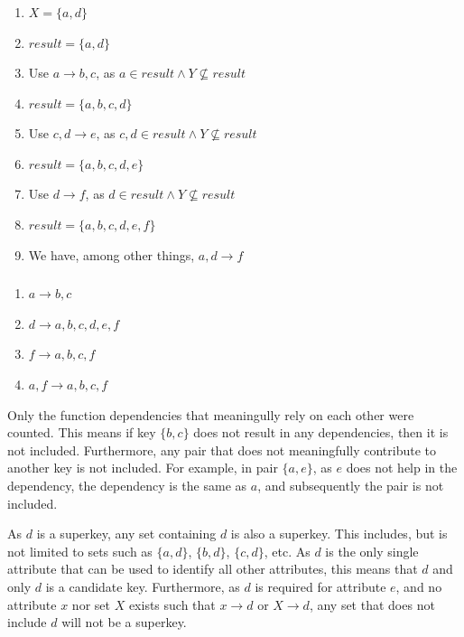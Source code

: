 \documentclass[letterpaper]{article}
\theoremstyle{plain}
\theoremstyle{definition}
\theoremstyle{remark}
\begin{document}
\subsubsection{}
\begin{enumerate}
    \item $X=\{a,d\}$
    \item $\textit{result}=\{a,d\}$
    \item Use $a\to b,c$, as $a\in\textit{result}\land{Y\nsubseteq\textit{result}}$
    \item $\textit{result}=\{a,b,c,d\}$
    \item Use $c,d\to e$, as $c,d\in\textit{result}\land{Y\nsubseteq\textit{result}}$
    \item $\textit{result}=\{a,b,c,d,e\}$
    \item Use $d\to f$, as $d\in\textit{result}\land{Y\nsubseteq\textit{result}}$
    \item $\textit{result}=\{a,b,c,d,e,f\}$
    \item We have, among other things, $a,d\to f$
\end{enumerate}
\subsubsection{}
\begin{enumerate}
    \item $a\to b,c$
    \item $d\to a,b,c,d,e,f$
    \item $f\to a,b,c,f$
    \item $a,f\to a,b,c,f$
\end{enumerate}
Only the function dependencies that meaningully rely on each other were counted. This means if key $\{b,c\}$ does not result in any dependencies, then it is not included. Furthermore, any pair that does not meaningfully contribute to another key is not included. For example, in pair $\{a,e\}$, as $e$ does not help in the dependency, the dependency is the same as $a$, and subsequently the pair is not included.

As $d$ is a superkey, any set containing $d$ is also a superkey. This includes, but is not limited to sets such as $\{a,d\}$, $\{b,d\}$, $\{c,d\}$, etc. As $d$ is the only single attribute that can be used to identify all other attributes, this means that $d$ and only $d$ is a candidate key. Furthermore, as $d$ is required for attribute $e$, and no attribute $x$ nor set $X$ exists such that $x\to d$ or $X\to d$, any set that does not include $d$ will not be a superkey. 
\newpage
\end{document}
